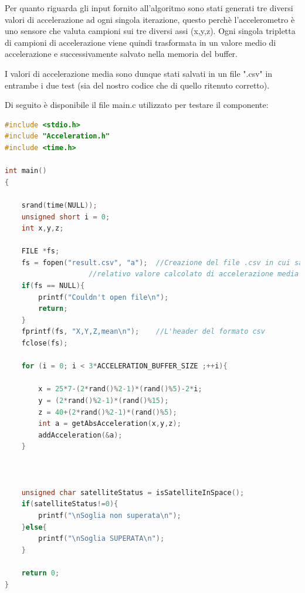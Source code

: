 \documentclass[LaM,binding=0.6cm]{../sapthesis}
\begin{document}
Per quanto riguarda gli input fornito all'algoritmo sono stati generati tre diversi valori di accelerazione ad ogni singola iterazione, questo perchè l'accelerometro è uno sensore che valuta campioni sui tre diversi assi (x,y,z).
Ogni singola tripletta di campioni di accelerazione viene quindi trasformata in un valore medio di accelerazione e successivamente salvato nella memoria del buffer.

I valori di accelerazione media sono dunque stati salvati in un file ".csv" in entrambe i due test (sia del nostro codice che di quello ritenuto corretto).

Di seguito è disponibile il file main.c utilizzato per testare il componente:

\begin{small}
\begin{lstlisting}[language=C]
#include <stdio.h>
#include "Acceleration.h"
#include <time.h>

int main()
{
    
    srand(time(NULL));
    unsigned short i = 0;
    int x,y,z;
    
    FILE *fs;
    fs = fopen("result.csv", "a");	//Creazione del file .csv in cui salvare i valori di accelerazione e 
					//relativo valore calcolato di accelerazione media
	if(fs == NULL){
	    printf("Couldn't open file\n");
	    return;
	}
	fprintf(fs, "X,Y,Z,mean\n");	//L'header del formato csv
    fclose(fs);
	
    for (i = 0; i < 3*ACCELERATION_BUFFER_SIZE ;++i){
	
    	x = 25*7-(2*rand()%2-1)*(rand()%5)-2*i;
    	y = (2*rand()%2-1)*(rand()%15);
    	z = 40+(2*rand()%2-1)*(rand()%5);
        int a = getAbsAcceleration(x,y,z);
        addAcceleration(&a);
    }    
	
	

    unsigned char satelliteStatus = isSatelliteInSpace();
    if(satelliteStatus!=0){
        printf("\nSoglia non superata\n");
    }else{
        printf("\nSoglia SUPERATA\n");
    }

    return 0;
}
\end{lstlisting}
\end{small}
\end{document}
